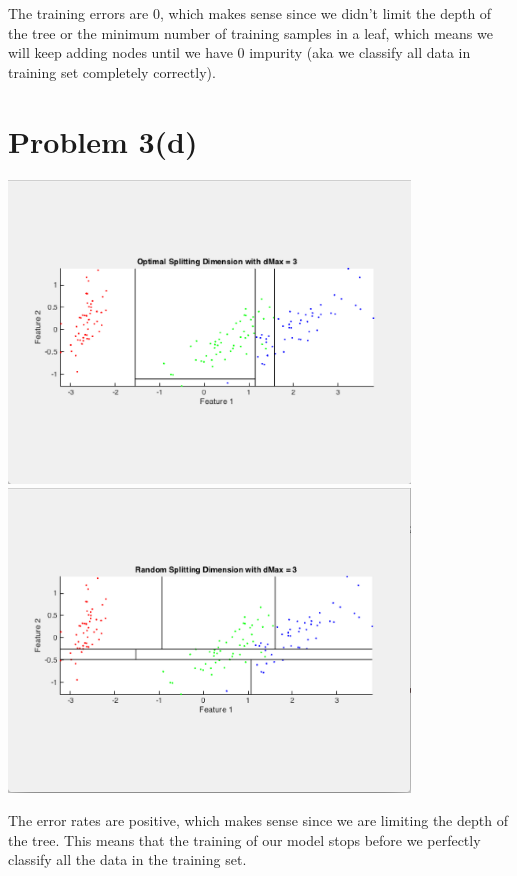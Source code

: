 \documentclass{article}
\begin{document}
The training errors are 0, which makes sense since we didn't limit the depth of the tree or the minimum number of training samples in a leaf, which means we will keep adding nodes until we have 0 impurity (aka we classify all data in training set completely correctly).

\section*{Problem 3(d)}

\begin{center}
\includegraphics[width=0.8\textwidth]{3d_optimal_splitting_dimension.png}
\includegraphics[width=0.8\textwidth]{3d_random_splitting_dimension.png}
\end{center}

The error rates are positive, which makes sense since we are limiting the depth of the tree. This means that the training of our model stops before we perfectly classify all the data in the training set.
\end{document}
